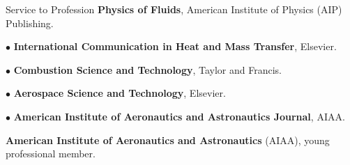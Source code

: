 \begin{rubric}{Service to Profession}
\entry*[2017 - present] {$\bullet$} \textbf{Physics of Fluids}, American Institute of Physics (AIP) Publishing.\par
{$\bullet$} \textbf{International Communication in Heat and Mass Transfer}, Elsevier.\par
{$\bullet$} \textbf{Combustion Science and Technology}, Taylor and Francis.\par
{$\bullet$} \textbf{Aerospace Science and Technology}, Elsevier.\par
{$\bullet$} \textbf{American Institute of Aeronautics and Astronautics Journal}, AIAA. \par
{}
\entry*[2023 - present] \textbf{American Institute of Aeronautics and Astronautics} (AIAA), young professional member.
\end{rubric}